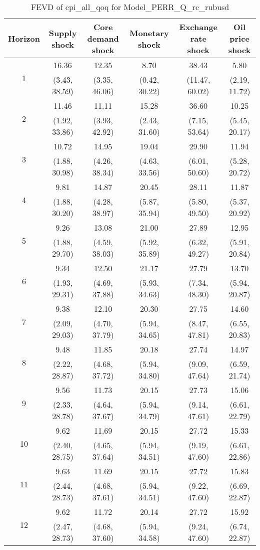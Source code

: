 \documentclass{article}
\begin{document}
\begin{table}
	\footnotesize
	\caption{FEVD of cpi_all_qoq for Model_PERR_Q_rc_rubusd}
	\begin{tabular}{cccccc}
		Horizon & Supply shock & Core demand shock & Monetary shock & Exchange rate shock & Oil price shock\\ \hline
		\multirow{2}{*}{1} & 16.36 & 12.35 & 8.70 & 38.43 & 5.80\\
		 & (3.43, 38.59) & (3.35, 46.06) & (0.42, 30.22) & (11.47, 60.02) & (2.19, 11.72)\\
		\multirow{2}{*}{2} & 11.46 & 11.11 & 15.28 & 36.60 & 10.25\\
		 & (1.92, 33.86) & (3.93, 42.92) & (2.43, 31.60) & (7.15, 53.64) & (5.45, 20.17)\\
		\multirow{2}{*}{3} & 10.72 & 14.95 & 19.04 & 29.90 & 11.94\\
		 & (1.88, 30.98) & (4.26, 38.34) & (4.63, 33.56) & (6.01, 50.60) & (5.28, 20.72)\\
		\multirow{2}{*}{4} & 9.81 & 14.87 & 20.45 & 28.11 & 11.87\\
		 & (1.88, 30.20) & (4.28, 38.97) & (5.87, 35.94) & (5.80, 49.50) & (5.37, 20.92)\\
		\multirow{2}{*}{5} & 9.26 & 13.08 & 21.00 & 27.89 & 12.95\\
		 & (1.88, 29.70) & (4.59, 38.03) & (5.92, 35.89) & (6.32, 49.27) & (5.91, 20.84)\\
		\multirow{2}{*}{6} & 9.34 & 12.50 & 21.17 & 27.79 & 13.70\\
		 & (1.93, 29.31) & (4.69, 37.88) & (5.93, 34.63) & (7.34, 48.30) & (5.94, 20.87)\\
		\multirow{2}{*}{7} & 9.38 & 12.10 & 20.30 & 27.75 & 14.60\\
		 & (2.09, 29.03) & (4.70, 37.79) & (5.94, 34.65) & (8.47, 47.81) & (6.55, 20.83)\\
		\multirow{2}{*}{8} & 9.48 & 11.85 & 20.18 & 27.74 & 14.97\\
		 & (2.22, 28.87) & (4.68, 37.72) & (5.94, 34.80) & (9.09, 47.64) & (6.59, 21.74)\\
		\multirow{2}{*}{9} & 9.56 & 11.73 & 20.15 & 27.73 & 15.06\\
		 & (2.33, 28.78) & (4.64, 37.67) & (5.94, 34.79) & (9.14, 47.61) & (6.61, 22.79)\\
		\multirow{2}{*}{10} & 9.62 & 11.69 & 20.15 & 27.72 & 15.33\\
		 & (2.40, 28.75) & (4.65, 37.64) & (5.94, 34.51) & (9.19, 47.60) & (6.61, 22.86)\\
		\multirow{2}{*}{11} & 9.63 & 11.69 & 20.15 & 27.72 & 15.83\\
		 & (2.44, 28.73) & (4.68, 37.61) & (5.94, 34.51) & (9.22, 47.60) & (6.69, 22.87)\\
		\multirow{2}{*}{12} & 9.62 & 11.72 & 20.14 & 27.72 & 15.92\\
		 & (2.47, 28.73) & (4.68, 37.60) & (5.94, 34.58) & (9.24, 47.60) & (6.74, 22.87)\\
	\end{tabular}
\label{tab:fevd-Model_PERR_Q_rc_rubusd-cpi_all_qoq}
\end{table}
\end{document}
